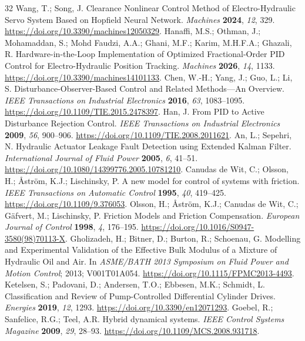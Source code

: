 \documentclass[machines,article,submit,pdftex,moreauthors]{Definitions/mdpi}
\begin{document}
\begin{thebibliography}{32}
 Wang, T.; Song, J. Clearance Nonlinear Control Method of Electro-Hydraulic Servo System Based on Hopfield Neural Network. \emph{Machines} \textbf{2024}, \emph{12}, 329. \url{https://doi.org/10.3390/machines12050329}.
 Hanaffi, M.S.; Othman, J.; Mohamaddan, S.; Mohd Faudzi, A.A.; Ghani, M.F.; Karim, M.H.F.A.; Ghazali, R. Hardware-in-the-Loop Implementation of Optimized Fractional-Order PID Control for Electro-Hydraulic Position Tracking. \emph{Machines} \textbf{2026}, \emph{14}, 1133. \url{https://doi.org/10.3390/machines14101133}.
 Chen, W.-H.; Yang, J.; Guo, L.; Li, S. Disturbance-Observer-Based Control and Related Methods---An Overview. \emph{IEEE Transactions on Industrial Electronics} \textbf{2016}, \emph{63}, 1083--1095. \url{https://doi.org/10.1109/TIE.2015.2478397}.
 Han, J. From PID to Active Disturbance Rejection Control. \emph{IEEE Transactions on Industrial Electronics} \textbf{2009}, \emph{56}, 900--906. \url{https://doi.org/10.1109/TIE.2008.2011621}.
 An, L.; Sepehri, N. Hydraulic Actuator Leakage Fault Detection using Extended Kalman Filter. \emph{International Journal of Fluid Power} \textbf{2005}, \emph{6}, 41--51. \url{https://doi.org/10.1080/14399776.2005.10781210}.
 Canudas de Wit, C.; Olsson, H.; \AA{}str\"om, K.J.; Lischinsky, P. A new model for control of systems with friction. \emph{IEEE Transactions on Automatic Control} \textbf{1995}, \emph{40}, 419--425. \url{https://doi.org/10.1109/9.376053}.
 Olsson, H.; \AA{}str\"om, K.J.; Canudas de Wit, C.; G\"afvert, M.; Lischinsky, P. Friction Models and Friction Compensation. \emph{European Journal of Control} \textbf{1998}, \emph{4}, 176--195. \url{https://doi.org/10.1016/S0947-3580(98)70113-X}.
 Gholizadeh, H.; Bitner, D.; Burton, R.; Schoenau, G. Modelling and Experimental Validation of the Effective Bulk Modulus of a Mixture of Hydraulic Oil and Air. In \emph{ASME/BATH 2013 Symposium on Fluid Power and Motion Control}; 2013; V001T01A054. \url{https://doi.org/10.1115/FPMC2013-4493}.
 Ketelsen, S.; Padovani, D.; Andersen, T.O.; Ebbesen, M.K.; Schmidt, L. Classification and Review of Pump-Controlled Differential Cylinder Drives. \emph{Energies} \textbf{2019}, \emph{12}, 1293. \url{https://doi.org/10.3390/en12071293}.
 Goebel, R.; Sanfelice, R.G.; Teel, A.R. Hybrid dynamical systems. \emph{IEEE Control Systems Magazine} \textbf{2009}, \emph{29}, 28--93. \url{https://doi.org/10.1109/MCS.2008.931718}.

\end{thebibliography}
\end{document}
